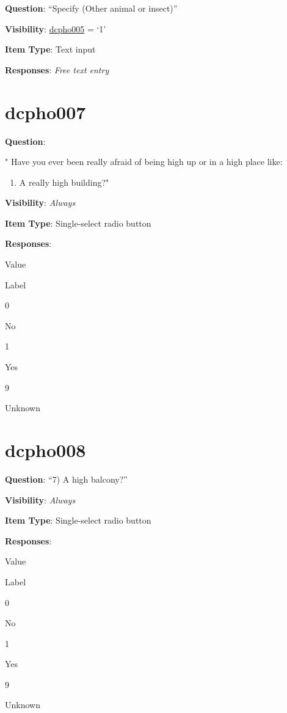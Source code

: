 \documentclass[]{book}
\providecommand{\tightlist}{%
  \setlength{\itemsep}{0pt}\setlength{\parskip}{0pt}}
\begin{document}
\textbf{Question}: ``Specify (Other animal or insect)''

\textbf{Visibility}: \protect\hyperlink{dcpho005}{dcpho005} = `1'

\textbf{Item Type}: Text input

\textbf{Responses}: \emph{Free text entry}

\hypertarget{dcpho007}{%
\section{dcpho007}\label{dcpho007}}

\textbf{Question}:

"
Have you ever been really afraid of being high up or in a high place like:

\begin{enumerate}
\def\labelenumi{\arabic{enumi})}
\setcounter{enumi}{5}
\tightlist
\item
  A really high building?"
\end{enumerate}

\textbf{Visibility}: \emph{Always}

\textbf{Item Type}: Single-select radio button

\textbf{Responses}:

Value

Label

0

No

1

Yes

9

Unknown

\hypertarget{dcpho008}{%
\section{dcpho008}\label{dcpho008}}

\textbf{Question}: ``7) A high balcony?''

\textbf{Visibility}: \emph{Always}

\textbf{Item Type}: Single-select radio button

\textbf{Responses}:

Value

Label

0

No

1

Yes

9

Unknown
\end{document}
